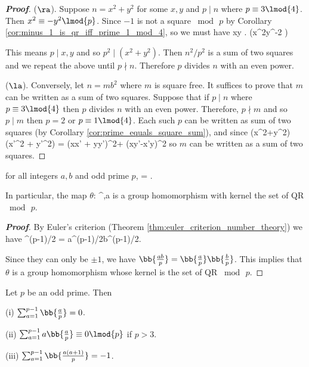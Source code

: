\begin{proof}[\bf Proof]
($\ra$).  Suppose $n = x^2 + y^2$ for some $x,y$ and $p\mid n$ where $p\equiv 3\lmod{4}$. Then $x^2 \equiv -y^2\lmod{p}$. Since $-1$ is not a square $\bmod\, p$ by Corollary \ref{cor:minus_1_is_qr_iff_prime_1_mod_4}, so we must have
\be
x\equiv y . \qquad (x^2y^{-2}  )
\ee

This means $p\mid x,y$ and so $p^2 \mid (x^2+y^2)$. Then $n^2/p^2$ is a sum of two squares and we repeat the above until $p\nmid n$. Therefore $p$ divides $n$ with an even power.

($\la$). Conversely, let $n = mb^2$ where $m$ is square free. It suffices to prove that $m$ can be written as a sum of two squares. Suppose that if $p\mid n$ where $p \equiv 3\lmod{4}$ then $p$ divides $n$ with an even power. Therefore, $p\nmid m$ and so $p\mid m$ then $p=2$ or $p\equiv 1\lmod{4}$. Each such $p$ can be written as sum of two squares (by Corollary \ref{cor:prime_equals_square_sum}), and since 
\be
(x^2+y^2)(x'^2 + y'^2) = (xx' + yy')^2+ (xy'-x'y)^2
\ee
so $m$ can be written as a sum of two squares.
\end{proof}



\begin{proposition}\label{pro:product_of_legendre_symbol}
for all integers $a,b$ and odd prime $p$,
\be
{} = .
\ee

In particular, the map $\theta$:
\be
{}^\times \to {},\quad a\mapsto {}
\ee
is a group homomorphism with kernel the set of QR $\bmod\, p$.
\end{proposition}

\begin{proof}[\bf Proof]
By Euler's criterion (Theorem \ref{thm:euler_criterion_number_theory}) we have
\be
{} \equiv {}^{(p-1)/2} = a^{(p-1)/2}b^{(p-1)/2}\equiv {}. 
\ee

Since they can only be $\pm 1$, we have $\bb{\frac{ab}p} = \bb{\frac ap}\bb{\frac bp}$. This implies that $\theta$ is a group homomorphism whose kernel is the set of QR $\bmod \, p$.
\end{proof}


\begin{proposition}
Let $p$ be an odd prime. Then
\ben
\item [(i)] $\sum^{p-1}_{a=1}\bb{\frac ap} = 0$.
\item [(ii)] $\sum^{p-1}_{a=1}a\bb{\frac ap} \equiv 0\lmod{p}$ if $p>3$.
\item [(iii)] $\sum^{p-1}_{a=1}\bb{\frac{a(a+1)}p} = -1$.
\een
\end{proposition}


